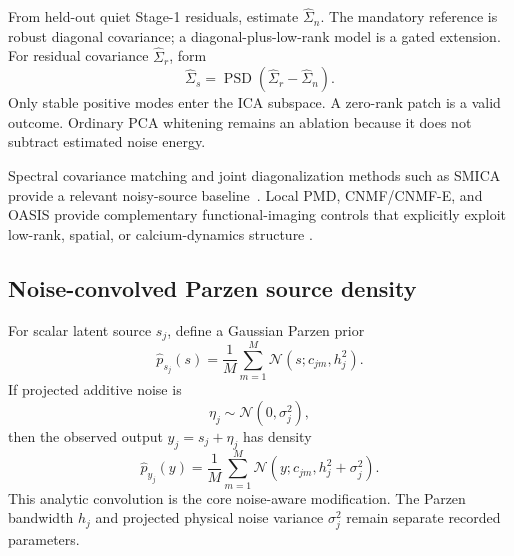\documentclass[11pt]{article}
\newcommand{\N}{\mathcal N}
\begin{document}
From held-out quiet Stage-1 residuals, estimate \(\widehat\Sigma_n\). The
mandatory reference is robust diagonal covariance; a diagonal-plus-low-rank
model is a gated extension. For residual covariance \(\widehat\Sigma_r\), form
\begin{equation}
\widehat\Sigma_s=
\operatorname{PSD}\!\left(
\widehat\Sigma_r-\widehat\Sigma_n
\right).
\label{eq:noise-corrected-cov}
\end{equation}
Only stable positive modes enter the ICA subspace. A zero-rank patch is a valid
outcome. Ordinary PCA whitening remains an ablation because it does not subtract
estimated noise energy.

Spectral covariance matching and joint diagonalization methods such as SMICA
provide a relevant noisy-source baseline~\cite{ablin2020smica}. Local PMD,
CNMF/CNMF-E, and OASIS provide complementary functional-imaging controls that
explicitly exploit low-rank, spatial, or calcium-dynamics structure
\cite{buchanan2018,pnevmatikakis2016,zhou2018,friedrich2017}.

\subsection{Noise-convolved Parzen source density}

For scalar latent source \(s_j\), define a Gaussian Parzen prior
\begin{equation}
\widehat p_{s_j}(s)=
\frac{1}{M}\sum_{m=1}^{M}
\N(s;c_{jm},h_j^2).
\label{eq:source-parzen}
\end{equation}
If projected additive noise is
\begin{equation}
\eta_j\sim\N(0,\sigma_j^2),
\end{equation}
then the observed output \(y_j=s_j+\eta_j\) has density
\begin{equation}
\widehat p_{y_j}(y)=
\frac{1}{M}\sum_{m=1}^{M}
\N\!\left(y;c_{jm},h_j^2+\sigma_j^2\right).
\label{eq:noisy-parzen}
\end{equation}
This analytic convolution is the core noise-aware modification. The Parzen
bandwidth \(h_j\) and projected physical noise variance \(\sigma_j^2\) remain
separate recorded parameters.
\end{document}
